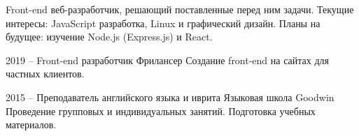 \documentclass[9pt]{developercv} %
\begin{document}
\vspace{0.5cm}

\begin{minipage}[t]{0.4\textwidth} %
	\vspace{-\baselineskip} %
Front-end веб-разработчик, решающий поставленные перед ним задачи. Текущие интересы: JavaScript разработка, Linux и графический дизайн. Планы на будущее: изучение Node.js (Express.js) и React.	
\end{minipage}
\hfill %
\begin{minipage}[t]{0.5\textwidth} %
	\vspace{-\baselineskip} %
	\begin{barchart}{5.5}
	\end{barchart}
\end{minipage}


\begin{entrylist}
  \entry
      {2019 --  }
      {Front-end разработчик}
      {Фрилансер}
      {Создание front-end на сайтах для частных клиентов.}
\end{entrylist}

\begin{entrylist}
  \entry
      {2015 --  }
      {Преподаватель английского языка и иврита}
      {Языковая школа Goodwin}
      {Проведение групповых и индивидуальных занятий. Подготовка учебных материалов.}
\end{entrylist}

\end{document}
